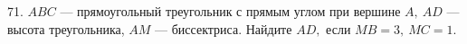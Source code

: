 71. $ABC$ --- прямоугольный треугольник с прямым углом при вершине $A,\ AD$ --- высота треугольника, $AM$ --- биссектриса. Найдите $AD,$ если $MB=3,\ MC=1.$\\
